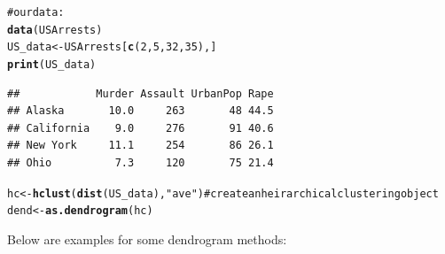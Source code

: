 \documentclass[shortnames,nojss,article]{jss}\usepackage{graphicx, color}
\makeatletter
\newcommand{\hlfunctioncall}[1]{\textcolor[rgb]{0.501960784313725,0,0.329411764705882}{\textbf{#1}}}%
\newcommand{\hlstring}[1]{\textcolor[rgb]{0.6,0.6,1}{#1}}%
\newcommand{\hlcomment}[1]{\textcolor[rgb]{0.180392156862745,0.6,0.341176470588235}{#1}}%
\newenvironment{kframe}{%
 \def\at@end@of@kframe{}%
 \ifinner\ifhmode%
  \def\at@end@of@kframe{\end{minipage}}%
  \begin{minipage}{\columnwidth}%
 \fi\fi%
 \def\FrameCommand##1{\hskip\@totalleftmargin \hskip-\fboxsep
 \colorbox{shadecolor}{##1}\hskip-\fboxsep
     \hskip-\linewidth \hskip-\@totalleftmargin \hskip\columnwidth}%
 \MakeFramed {\advance\hsize-\width
   \@totalleftmargin\z@ \linewidth\hsize
   \@setminipage}}%
 {\par\unskip\endMakeFramed%
 \at@end@of@kframe}
\newenvironment{knitrout}{}{} %
\makeatother
\begin{document}
\begin{knitrout}
\color{fgcolor}\begin{kframe}
\begin{alltt}
\hlcomment{# our data:}
\hlfunctioncall{data}(USArrests)
US_data <- USArrests[\hlfunctioncall{c}(2, 5, 32, 35), ]
\hlfunctioncall{print}(US_data)
\end{alltt}
\begin{verbatim}
##            Murder Assault UrbanPop Rape
## Alaska       10.0     263       48 44.5
## California    9.0     276       91 40.6
## New York     11.1     254       86 26.1
## Ohio          7.3     120       75 21.4
\end{verbatim}
\begin{alltt}

hc <- \hlfunctioncall{hclust}(\hlfunctioncall{dist}(US_data), \hlstring{"ave"})  # create an heirarchical clustering object
dend <- \hlfunctioncall{as.dendrogram}(hc)
\end{alltt}
\end{kframe}
\end{knitrout}



Below are examples for some dendrogram methods:
\end{document}
